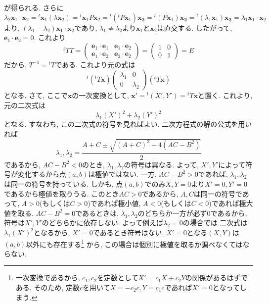 \documentclass[a4j,dvipdfmx]{jsarticle}
\numberwithin{equation}{section}
\begin{document}
            が得られる.  さらに
            \begin{equation*}
                \lambda_2 \bm{x}_1\cdot\bm{x}_2={}^t\!\bm{x}_1(\lambda\bm{x}_2)={}^t\!\bm{x}_1P\bm{x}_2={}^t\!({}^t\!P\bm{x}_1)\bm{x_2}={}^t\!(P\bm{x}_1)\bm{x_2}={}^t\!(\lambda_1\bm{x}_1)\bm{x_2}=\lambda_1\bm{x}_1\cdot\bm{x}_2
            \end{equation*}
            より, $(\lambda_1-\lambda_2)\bm{x}_1\cdot\bm{x}_2$であり, $\lambda_1\neq \lambda_2$より$\bm{x}_1$と$\bm{x}_2$は直交する. したがって, $\bm{e}_1\cdot\bm{e}_2=0$.
            これより
            \begin{equation*}
                {}^t\!TT=\begin{pmatrix}\bm{e}_1\cdot\bm{e}_1 & \bm{e}_1\cdot\bm{e}_2 \\ \bm{e}_1\cdot\bm{e}_2 & \bm{e}_2\cdot\bm{e}_2\end{pmatrix}=\begin{pmatrix}1 & 0 \\ 0 & 1\end{pmatrix}=E
            \end{equation*}
            だから, $T^{-1}={}^t\!T$である. これより元の式は
            \begin{equation*}
                {}^t\!({}^t\!T\bm{x})\begin{pmatrix}\lambda_1 & 0 \\ 0 & \lambda_2\end{pmatrix}({}^t\!T\bm{x})
            \end{equation*}
            となる. さて, ここで$\bm{x}$の一次変換として, $\bm{x}'={}^t\!(X',Y')={}^t\!T\bm{x}$と置く. これより, 元の二次式は
            \begin{equation*}
                \lambda_1(X')^2+\lambda_2(Y')^2
            \end{equation*}
            となる. すなわち, この二次式の符号を見ればよい. 二次方程式の解の公式を用いれば
            \begin{equation*}
                \lambda_1,\lambda_2=\frac{A+C\pm\sqrt{(A+C)^2-4(AC-B^2)}}{2}
            \end{equation*}
            であるから, $AC-B^2<0$のとき, $\lambda_1,\lambda_2$の符号は異なる. よって, $X',Y'$によって符号が変化するから点$(a,b)$は極値ではない.
            一方, $AC-B^2>0$であれば, $\lambda_1,\lambda_2$は同一の符号を持っている. しかも, 点$(a,b)$でのみ$X,Y=0$より$X'=0,Y'=0$であるから極値を取りうる.
            このとき$AC>0$であるから, $A,C$は同一の符号であって, $A>0$(もしくは$C>0$)であれば極小値, $A<0$(もしくは$C<0$)であれば極大値を取る.
            $AC-B^2=0$であるときは, $\lambda_1,\lambda_2$のどちらか一方が必ず0であるから, 符号は$X',Y'$のどちらかに依存しない. よって例えば$\lambda_2=0$の場合では
            二次式は$\lambda_1(X')^2$となるから, $X'=0$であるとき符号はない. $X'=0$となる$(X,Y)$は$(a,b)$以外にも存在する\footnote{一次変換であるから, $c_1,c_2$を定数として$X'=c_1X+c_2Y$の関係があるはずである. そのため, 定数$c$を用いて$X=-c_2c,Y=c_1c$であれば$X'=0$となってしまう.}
            から, この場合は個別に極値を取るか調べなくてはならない.
\end{document}
